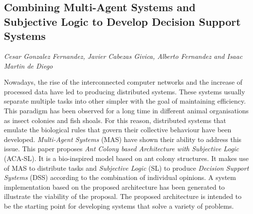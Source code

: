 \documentclass[../booklet.tex]{subfiles}
\begin{document}
\subsection[Combining Multi-Agent Systems and Subjective Logic to Develop Decision Support Systems. {\it Cesar Gonzalez Fernandez, Javier Cabezas Givica, Alberto Fernandez and Isaac Martin de Diego}]{Combining Multi-Agent Systems and Subjective Logic to Develop Decision Support Systems}
   

\begin{center}
  {\it Cesar Gonzalez Fernandez, Javier Cabezas Givica, Alberto Fernandez and Isaac Martin de Diego}
\end{center}


Nowadays, the rise of the interconnected computer networks and the increase of processed data have led to producing distributed systems. These systems usually separate multiple tasks into other simpler with the goal of maintaining efficiency. This paradigm has been observed for a long time in different animal organisations as insect colonies and fish shoals. For this reason, distributed systems that emulate the biological rules that govern their collective behaviour have been developed. \emph{Multi-Agent Systems} (MAS) have shown their ability to address this issue. This paper proposes \emph{Ant Colony based Architecture with Subjective Logic} (ACA-SL). It is a bio-inspired model based on ant colony structures. It makes use of MAS to distribute tasks and \emph{Subjective Logic} (SL) to produce \emph{Decision Support Systems} (DSS) according to the combination of individual opinions. A system implementation based on the proposed architecture has been generated to illustrate the viability of the proposal. The proposed architecture is intended to be the starting point for developing systems that solve a variety of problems.

\end{document}
